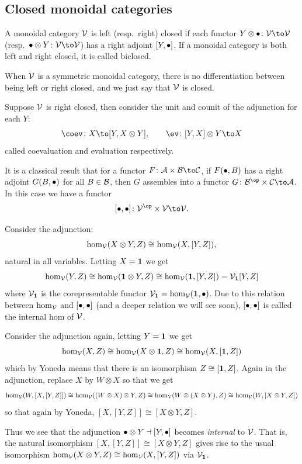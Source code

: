 \subsection{Closed monoidal categories}

\bdefn

    A monoidal category ${{\cal V}}$ is {\emphcolor left} (resp.\ {\emphcolor right}) {\emphcolor closed} if each functor
    $Y\otimes\bul\colon\V\to\V$ (resp.\ $\bul\otimes Y\colon\V\to\V$) has a right adjoint $[Y,\bullet]$.
    If a monoidal category is both left and right closed, it is called {\emphcolor biclosed}.

    When ${{\cal V}}$ is a symmetric monoidal category, there is no differentiation between being left or right closed, and we just
    say that ${{\cal V}}$ is {\emphcolor closed}.

\edefn

Suppose ${{\cal V}}$ is right closed, then consider the unit and counit of the adjunction for each $Y$:
$$ \coev\colon X\to[Y,X\otimes Y],\qquad \ev\colon[Y,X]\otimes Y\to X $$
called {\emphcolor coevaluation} and {\emphcolor evaluation} respectively.

It is a classical result that for a functor $F\colon\A\times\B\to\C$, if $F(\bullet,B)$ has a right adjoint $G(B,\bullet)$
for all $B\in{{\cal B}}$, then $G$ assembles into a functor $G\colon\B^\op\times\C\to\A$.
In this case we have a functor
$$ [\bul,\bul]\colon\V^\op\times\V\to\V . $$

Consider the adjunction:
$$ \hom_{{\cal V}}(X\otimes Y,Z) \cong \hom_{{\cal V}}(X,[Y,Z]) , $$
natural in all variables.
Letting $X={\bf1}$ we get
$$ \hom_{{\cal V}}(Y,Z) \cong \hom_{{\cal V}}({\bf1}\otimes Y,Z)\cong\hom_{{\cal V}}({\bf1},[Y,Z]) = {{\cal V}}_{\bf1}[Y,Z] $$
where ${{\cal V}}_{\bf1}$ is the corepresentable functor ${{\cal V}}_{\bf1}=\hom_{{\cal V}}({\bf1},\bullet)$.
Due to this relation between $\hom_{{\cal V}}$ and $[\bullet,\bullet]$ (and a deeper relation we will see soon), $[\bullet,\bullet]$ is called the
{\emphcolor internal hom} of ${{\cal V}}$.

Consider the adjunction again, letting $Y={\bf1}$ we get
$$ \hom_{{\cal V}}(X,Z) \cong \hom_{{\cal V}}(X\otimes{\bf1},Z) \cong \hom_{{\cal V}}(X,[{\bf1},Z]) $$
which by Yoneda means that there is an isomorphism $Z\cong[{\bf1},Z]$.
Again in the adjunction, replace $X$ by $W\otimes X$ so that we get
$$ \hom_{{\cal V}}(W,[X,[Y,Z]]) \cong \hom_{{\cal V}}((W\otimes X)\otimes Y,Z) \cong \hom_{{\cal V}}(W\otimes(X\otimes Y),Z) \cong
\hom_{{\cal V}}(W,[X\otimes Y,Z]) $$
so that again by Yoneda, $[X,[Y,Z]]\cong[X\otimes Y,Z]$.

Thus we see that the adjunction $\bullet\otimes Y\dashv[Y,\bullet]$ becomes {\it internal\/} to ${{\cal V}}$.
That is, the natural isomorphism $[X,[Y,Z]]\cong[X\otimes Y,Z]$ gives rise to the usual isomorphism
$\hom_{{\cal V}}(X\otimes Y,Z)\cong\hom_{{\cal V}}(X,[Y,Z])$ via ${{\cal V}}_{\bf1}$.

